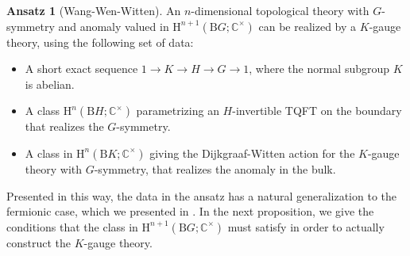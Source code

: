 \documentclass[11pt,reqno]{amsart}
\newcommand{\rH}{\mathrm{H}}
\newcommand{\rB}{\mathrm{B}}
\numberwithin{equation}{section}
\theoremstyle{plain}
\theoremstyle{definition}
\newtheorem{ansatz}[equation]{Ansatz}
\begin{document}
\begin{ansatz}[Wang-Wen-Witten]\label{ansatz:WWW}
    An $n$-dimensional topological theory with $G$-symmetry and anomaly valued in $\rH^{n+1}(\rB G; \mathbb{C}^\times)$ can be realized by a $K$-gauge theory, using the following set of data:
    \begin{itemize}
          \item A short exact sequence $1 \rightarrow K \rightarrow H \rightarrow G\rightarrow 1$, where the normal subgroup $K$ is abelian.
          \item A class $\rH^n(\rB H; \mathbb{C}^\times)$ parametrizing an $H$-invertible TQFT on the boundary that realizes the $G$-symmetry.
          \item A class in $\rH^{n}(\rB K; \mathbb{C}^\times)$ giving the Dijkgraaf-Witten action for the $K$-gauge theory with $G$-symmetry, that realizes the anomaly in the bulk. 
    \end{itemize}
\end{ansatz}
Presented in this way, the data in the ansatz has a natural generalization to the fermionic case, which we presented in .
In the next proposition, we give the conditions that the class in $\rH^{n+1}(\rB G;\mathbb C^\times)$  must satisfy in order to actually construct the $K$-gauge theory.
\end{document}
